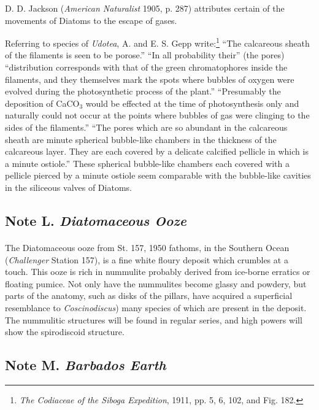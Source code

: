 \documentclass[a4paper, 12pt, oneside]{article}
\begin{document}
D. D. Jackson (\emph{American Naturalist} 1905, p. 287) attributes certain of the movements of Diatoms to the escape of gases.

Referring to species of \emph{Udotea}, A. and E. S. Gepp write:\footnote{\emph{The Codiaceae of the \emph{Siboga} Expedition}, 1911, pp. 5, 6, 102, and Fig. 182.} ``The calcareous sheath of the filaments is seen to be porose.'' ``In all probability their'' (the pores) ``distribution corresponds with that of the green chromatophores inside the filaments, and they themselves mark the spots where bubbles of oxygen were evolved during the photosynthetic process of the plant.'' ``Presumably the deposition of CaCO$_{3}$ would be effected at the time of photosynthesis only and naturally could not occur at the points where bubbles of gas were clinging to the sides of the filaments.'' ``The pores which are so abundant in the calcareous sheath are minute spherical bubble-like chambers in the thickness of the calcareous layer. They are each covered by a delicate calcified pellicle in which is a minute ostiole.'' These spherical bubble-like chambers each covered with a pellicle pierced by a minute ostiole seem comparable with the bubble-like cavities in the siliceous valves of Diatoms.

\subsection{Note L. \emph{Diatomaceous Ooze}}
\paragraph{}
The Diatomaceous ooze from St. 157, 1950 fathoms, in the Southern Ocean (\emph{Challenger} Station 157), is a fine white floury deposit which crumbles at a touch. This ooze is rich in nummulite probably derived from ice-borne erratics or floating pumice. Not only have the nummulites become glassy and powdery, but parts of the anatomy, such as disks of the pillars, have acquired a superficial resemblance to \emph{Coscinodiscus}) many species of which are present in the deposit. The nummulitic structures will be found in regular series, and high powers will show the spirodiscoid structure.

\subsection{Note M. \emph{Barbados Earth}}
\end{document}
